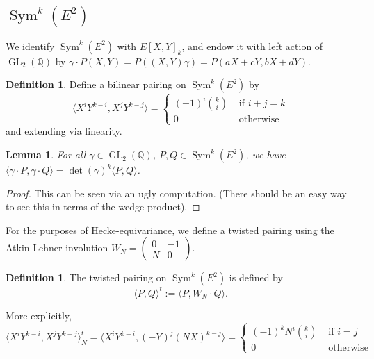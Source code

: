 \documentclass[10pt]{amsart}
\theoremstyle{plain}
\newtheorem{lemma}[theorem]{Lemma}
\theoremstyle{definition}
\newtheorem{definition}[theorem]{Definition}
\newcommand{\QQ}{{\mathbb{Q}}}
\DeclareMathOperator{\GL}{GL}
\DeclareMathOperator{\Sym}{Sym}
\begin{document}
\subsection{$\Sym^k(E^2)$}

We identify $\Sym^k(E^2)$ with $E[X,Y]_k$, and endow it with left action of $\GL_2(\QQ)$ by $\gamma \cdot P(X,Y) = P((X,Y)\gamma)=P(aX+cY,bX+dY).$ 
\begin{definition}
Define a bilinear pairing on $\Sym^k(E^2)$ by
\begin{equation*}
	\langle X^iY^{k-i}, X^j Y^{k-j} \rangle = \begin{cases} (-1)^i {k \choose i} & \text{ if } i+j=k\\
												0	& \text{ otherwise} \end{cases}
\end{equation*}
and extending via linearity.
\end{definition}


\begin{lemma}
For all $\gamma\in \GL_2(\QQ)$, $P,Q\in\Sym^k(E^2)$, we have $\langle \gamma\cdot P,\gamma \cdot Q\rangle = \det(\gamma)^k \langle P,Q\rangle$.
\end{lemma}
\begin{proof}
This can be seen via an ugly computation. (There should be an easy way to see this in terms of the wedge product).
\end{proof}

For the purposes of Hecke-equivariance, we define a twisted pairing using the Atkin-Lehner involution $W_N = \begin{pmatrix} 0 & -1 \\ N & 0 \end{pmatrix}$.
\begin{definition}
The twisted pairing on $\Sym^k(E^2)$ is defined by
\begin{equation}
	\langle P, Q\rangle^t := \langle P, W_N \cdot Q\rangle.
\end{equation}
\end{definition}
More explicitly,
\begin{equation*}
	\langle X^iY^{k-i}, X^j Y^{k-j} \rangle_N^t = \langle X^i Y^{k-i}, (-Y)^j(NX)^{k-j}\rangle= \begin{cases} (-1)^k N^i {k \choose i} & \text{ if } i=j\\
												0	& \text{ otherwise} \end{cases}
\end{equation*}
\end{document}
